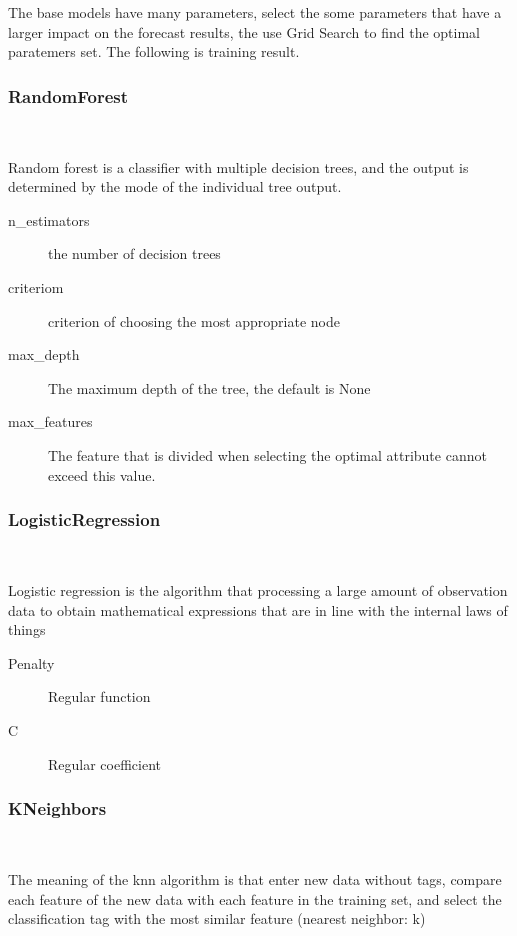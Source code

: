 The base models have many parameters,
select the some parameters that 
have a larger impact on 
the forecast results,
the use Grid Search to find 
the optimal paratemers set.	
The following is training result. 
\subsubsection{RandomForest}
\

Random forest is a classifier with 
multiple decision trees, and
the output is determined by 
the mode of the individual tree output.


\begin{description}
	\item[n_estimators] the number of decision trees
	\item[criteriom] criterion of choosing 
	the most appropriate node
	\item[max_depth] The maximum depth of the tree, 
	the default is None 
	\item[max_features] The feature that is divided 
	when selecting the optimal attribute 
	cannot exceed this value.
\end{description}




\subsubsection{LogisticRegression}
\

Logistic regression is the algorithm that 
processing a large amount of 
observation data to 
obtain mathematical expressions 
that are in line with 
the internal laws of things


\begin{description}
	\item[Penalty] Regular function
	\item[C] Regular coefficient
\end{description}




\subsubsection{KNeighbors}
\

The meaning of the knn algorithm is that 
enter new data without tags, 
compare each feature of the new data with 
each feature in the training set, 
and select the classification tag with 
the most similar feature (nearest neighbor: k)


